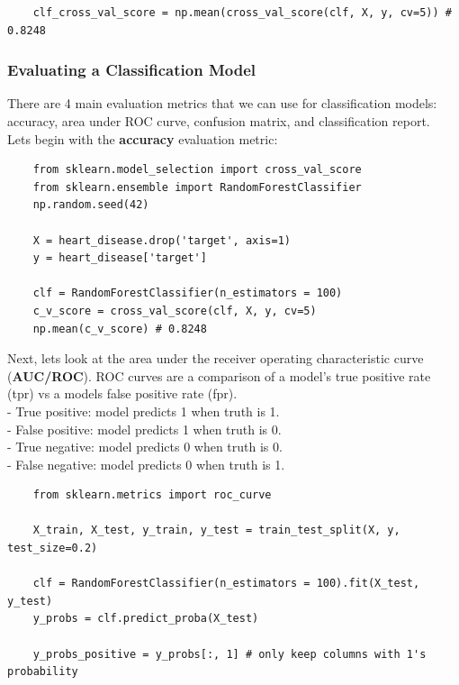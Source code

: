 \documentclass[11pt, a4paper]{article}
\begin{document}
\begin{spacing}{1.1}
\begin{lstlisting}
	clf_cross_val_score = np.mean(cross_val_score(clf, X, y, cv=5)) # 0.8248 \end{lstlisting} \vspace*{1mm}
	\subsubsection{Evaluating a Classification Model}
	There are 4 main evaluation metrics that we can use for classification models: accuracy, area under ROC curve, confusion matrix, and classification report. \vspace*{1.5mm} \\
	Lets begin with the \textbf{accuracy} evaluation metric: 
	\begin{lstlisting}
	from sklearn.model_selection import cross_val_score
	from sklearn.ensemble import RandomForestClassifier	
	np.random.seed(42)
	
	X = heart_disease.drop('target', axis=1)
	y = heart_disease['target']
	
	clf = RandomForestClassifier(n_estimators = 100)
	c_v_score = cross_val_score(clf, X, y, cv=5)
	np.mean(c_v_score) # 0.8248	\end{lstlisting} \vspace*{1mm}
	Next, lets look at the area under the receiver operating characteristic curve (\textbf{AUC/ROC}). ROC curves are a comparison of a model's true positive rate (tpr) vs a models false positive rate (fpr). \\
	\hspace*{2mm} - True positive: model predicts 1 when truth is 1. \\
	\hspace*{2mm} - False positive: model predicts 1 when truth is 0. \\
	\hspace*{2mm} - True negative: model predicts 0 when truth is 0. \\
	\hspace*{2mm} - False negative: model predicts 0 when truth is 1.
	\begin{lstlisting}
	from sklearn.metrics import roc_curve
	
	X_train, X_test, y_train, y_test = train_test_split(X, y, test_size=0.2)
	
	clf = RandomForestClassifier(n_estimators = 100).fit(X_test, y_test)
	y_probs = clf.predict_proba(X_test)
	
	y_probs_positive = y_probs[:, 1] # only keep columns with 1's probability \end{lstlisting} \newpage
	

\end{spacing}
\end{document}
